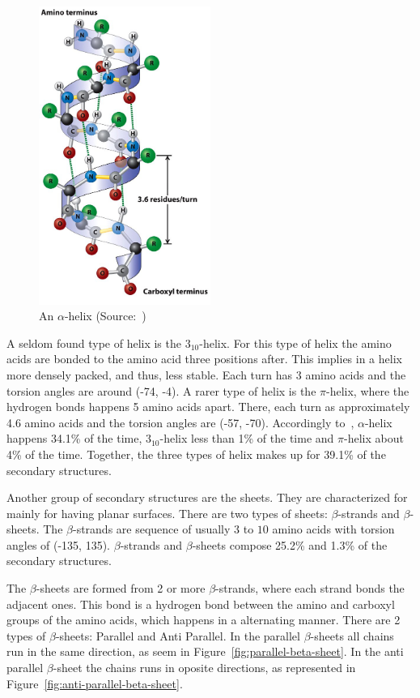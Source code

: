 \begin{figure}
    \centering
    \includegraphics[width=0.5\textwidth]{Figuras/alpha-helix.jpeg}
    \caption{An $\alpha$-helix (Source:~\cite{lodish2008molecular})}
    \label{fig:alpha-helix}
\end{figure}

A seldom found type of helix is the $3_{10}$-helix. For this type of helix the
amino acids are bonded to the amino acid three positions after. This implies in
a helix more densely packed, and thus, less stable. Each turn has $3$ amino
acids and the torsion angles are around (-74, -4). A rarer type of helix is the
$\pi$-helix, where the hydrogen bonds happens 5 amino acids apart. There, each
turn as approximately 4.6 amino acids and the torsion angles are (-57, -70).
Accordingly to~\cite{borguesan2015apl}, $\alpha$-helix happens 34.1\% of the
time, $3_{10}$-helix less than 1\% of the time and $\pi$-helix about 4\% of the
time. Together, the three types of helix makes up for 39.1\% of the secondary
structures.

Another group of secondary structures are the sheets. They are characterized
for mainly for having planar surfaces. There are two types of sheets:
$\beta$-strands and $\beta$-sheets. The $\beta$-strands are sequence of usually
$3$ to $10$ amino acids with torsion angles of (-135, 135). $\beta$-strands and
$\beta$-sheets compose 25.2\% and 1.3\% of the secondary structures.

The $\beta$-sheets are formed from 2 or more $\beta$-strands, where each strand
bonds the adjacent ones. This bond is a hydrogen bond between the amino and
carboxyl groups of the amino acids, which happens in a alternating manner.
There are 2 types of $\beta$-sheets: Parallel and Anti Parallel. In the
parallel $\beta$-sheets all chains run in the same direction, as seem in
Figure~\ref{fig:parallel-beta-sheet}. In the anti parallel $\beta$-sheet the
chains runs in oposite directions, as represented in
Figure~\ref{fig:anti-parallel-beta-sheet}.

